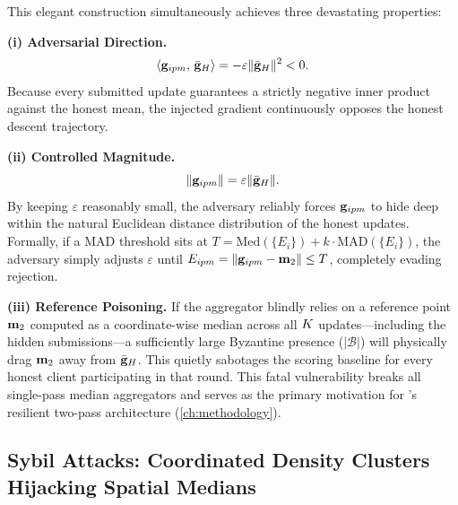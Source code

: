 \documentclass[../main]{subfiles}
\begin{document}
This elegant construction simultaneously achieves three devastating properties:

\textbf{(i) Adversarial Direction.}
\begin{equation}
    \left\langle \mathbf{g}_{ipm},\, \bar{\mathbf{g}}_{H} \right\rangle = -\varepsilon\|\bar{\mathbf{g}}_{H}\|^2 < 0.
    \label{eq:ipm_direction}
\end{equation}
Because every submitted \ipm{} update guarantees a strictly negative inner product against the honest mean, the injected gradient continuously opposes the honest descent trajectory.

\textbf{(ii) Controlled Magnitude.}
\begin{equation}
    \left\lVert \mathbf{g}_{ipm} \right\rVert = \varepsilon\|\bar{\mathbf{g}}_{H}\|.
    \label{eq:ipm_norm}
\end{equation}
By keeping $\varepsilon$ reasonably small, the adversary reliably forces $\mathbf{g}_{ipm}$ to hide deep within the natural Euclidean distance distribution of the honest updates. Formally, if a MAD threshold sits at $T = \mathrm{Med}(\{E_i\}) + k \cdot \mathrm{MAD}(\{E_i\})$, the adversary simply adjusts $\varepsilon$ until $E_{ipm} = \left\lVert \mathbf{g}_{ipm} - \mathbf{m}_{2} \right\rVert \leq T$, completely evading rejection.

\textbf{(iii) Reference Poisoning.}
If the aggregator blindly relies on a reference point $\mathbf{m}_{2}$ computed as a coordinate-wise median across all $K$ updates---including the hidden \ipm{} submissions---a sufficiently large Byzantine presence ($|\mathcal{B}|$) will physically drag $\mathbf{m}_{2}$ away from $\bar{\mathbf{g}}_{H}$. This quietly sabotages the scoring baseline for every honest client participating in that round. This fatal vulnerability breaks all single-pass median aggregators and serves as the primary motivation for \aegis{}'s resilient two-pass architecture (\cref{ch:methodology}).

\subsection{Sybil Attacks: Coordinated Density Clusters Hijacking Spatial Medians}
\label{sec:attack_sybil}
\end{document}
